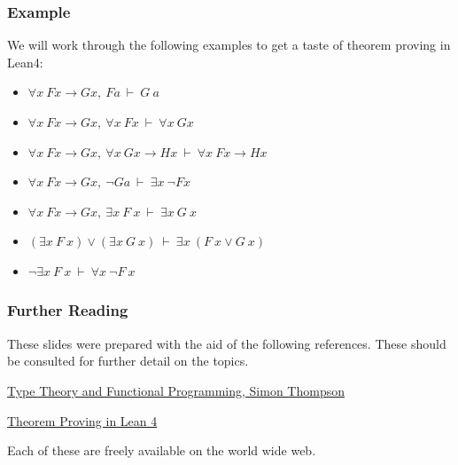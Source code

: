 \documentclass{beamer}
\theoremstyle{indentDefn} \newtheorem{defn}[]{Definition}
\begin{document}
\begin{frame}
\frametitle{Example}
We will work through the following examples to get a taste of theorem proving in Lean4:

\begin{itemize}
	\item[] $\forall x \ Fx \to Gx, \ F a \ \vdash \ G \ a$
	\item[] $\forall x \ Fx \to Gx, \ \forall x \ Fx \ \vdash \ \forall x \ Gx$
	\item[] $\forall x \ Fx \to Gx, \ \forall x \ Gx \to Hx \ \vdash \ \forall x \ Fx \to Hx$ 
	\item[] $\forall x \ Fx \to Gx, \ \lnot G a \ \vdash \ \exists x \ \lnot F x$
	\item[] $\forall x \ Fx \to Gx, \ \exists x \ F \ x \ \vdash \ \exists x \ G \ x$
	\item[] $(\exists x \ F \ x) \lor (\exists x \ G \ x) \ \vdash \ \exists x \ (F \ x \lor G \ x)$
	\item[] $\lnot \exists x \ F \ x \ \vdash \ \forall x \ \lnot F \ x$
\end{itemize}
\end{frame}

%	
\begin{frame}
	\frametitle{Further Reading}
	
    These slides were prepared with the aid of the following references. These should be consulted for further detail on the topics. 
    
    \href{https://www.cs.kent.ac.uk/people/staff/sjt/TTFP/}{Type Theory and Functional Programming, Simon Thompson}
    
    \href{https://leanprover.github.io/theorem_proving_in_lean4/}{Theorem Proving in Lean 4}
    
    Each of these are freely available on the world wide web.
    
    \vspace{50mm}  
	
\end{frame}
\end{document}

